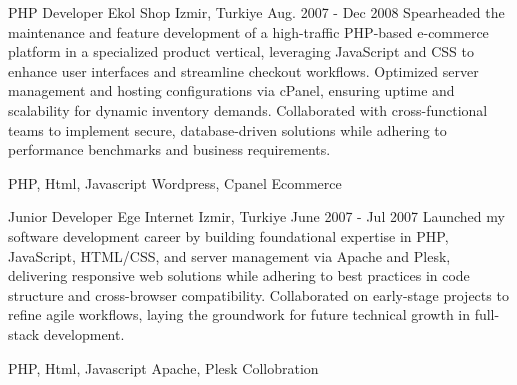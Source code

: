 \begin{cventries}
    \cventry
    {PHP Developer} %
    {Ekol Shop} %
    {Izmir, Turkiye} %
    {Aug. 2007 - Dec 2008} %
    {
      Spearheaded the maintenance and feature development of a high-traffic PHP-based e-commerce platform in a specialized product vertical, leveraging JavaScript and CSS to enhance user interfaces and streamline checkout workflows. Optimized server management and hosting configurations via cPanel, ensuring uptime and scalability for dynamic inventory demands. Collaborated with cross-functional teams to implement secure, database-driven solutions while adhering to performance benchmarks and business requirements.
    }
    {
      \begin{cvsubentries}%
        \cvsubentry {} {PHP, Html, Javascript} {} {} 
        \cvsubentry {} {Wordpress, Cpanel} {} {} 
        \cvsubentry {} {Ecommerce} {} {} 
      \end{cvsubentries}
    }

    \cventry
    {Junior Developer} %
    {Ege Internet} %
    {Izmir, Turkiye} %
    {June 2007 - Jul 2007} %
    {
      Launched my software development career by building foundational expertise in PHP, JavaScript, HTML/CSS, and server management via Apache and Plesk, delivering responsive web solutions while adhering to best practices in code structure and cross-browser compatibility. Collaborated on early-stage projects to refine agile workflows, laying the groundwork for future technical growth in full-stack development.
    }
    {
      \begin{cvsubentries}%
        \cvsubentry {} {PHP, Html, Javascript} {} {} 
        \cvsubentry {} {Apache, Plesk} {} {} 
        \cvsubentry {} {Collobration} {} {} 
      \end{cvsubentries}
    }
\end{cventries}
\newpage
